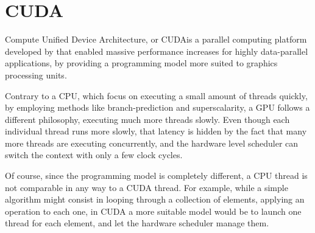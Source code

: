 \section{CUDA}
\label{sec:cuda}


Compute Unified Device Architecture, or CUDA\tm is a parallel computing platform developed by \nvidia that enabled massive performance increases for highly data-parallel applications, by providing a programming model more suited to graphics processing units.

Contrary to a CPU, which focus on executing a small amount of threads quickly, by employing methods like branch-prediction and superscalarity, a GPU follows a different philosophy, executing much more threads slowly. Even though each individual thread runs more slowly, that latency is hidden by the fact that many more threads are executing concurrently, and the hardware level scheduler can switch the context with only a few clock cycles.

Of course, since the programming model is completely different, a CPU thread is not comparable in any way to a CUDA thread. For example, while a simple algorithm might consist in looping through a collection of elements, applying an operation to each one, in CUDA a more suitable model would be to launch one thread for each element, and let the hardware scheduler manage them.





